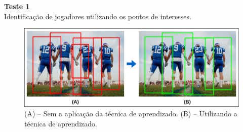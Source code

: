 \textbf{Teste 1}\\
Identificação de jogadores utilizando os pontos de interesses.

\begin{figure}
    \centering
    \caption{\label{fig_comparativo_img}(A) – Sem a aplicação da técnica de aprendizado. (B) – Utilizando a técnica de aprendizado.}
    \includegraphics[scale=0.3]{05-SLIDES_DESENVOLVIMENTO/Etapa_de_Testes/imagens_testes/comparativo_imagem.png}
\end{figure}